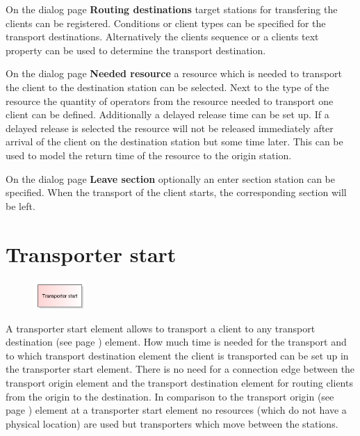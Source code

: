 On the dialog page \textbf{Routing destinations} target stations for transfering the
clients can be registered. Conditions or client types can be specified for the transport
destinations. Alternatively the clients sequence or a clients text property can be used to determine
the transport destination.

On the dialog page \textbf{Needed resource} a resource which is needed to transport
the client to the destination station can be selected. Next to the type of the
resource the quantity of operators from the resource needed to transport one
client can be defined. Additionally a delayed release time can be set up.
If a delayed release is selected the resource will not be released immediately
after arrival of the client on the destination station but some time later.
This can be used to model the return time of the resource to the origin
station.

On the dialog page \textbf{Leave section} optionally an enter section station can be specified.
When the transport of the client starts, the corresponding section will be left.


\section{Transporter start}
\label{ref:ModelElementTransportTransporterSource}

\begin{figure}
\vspace{-22pt}
\includegraphics[width=2cm]{imageModelElementTransportTransporterSource.png}
\vspace{-22pt}
\end{figure}

A transporter start element allows to transport a client to any
transport destination (see page \pageref{ref:ModelElementTransportDestination}) 
element. How much time is needed for the transport and to which
transport destination element the client is transported can be set up
in the transporter start element. 
There is no need for a connection edge between the transport origin element
and the transport destination element for routing clients from the origin to the
destination.
In comparison to the  transport origin (see page \pageref{ref:ModelElementTransportSource}) 
element at a transporter start element no resources (which do not have a physical location)
are used but transporters which move between the stations.

